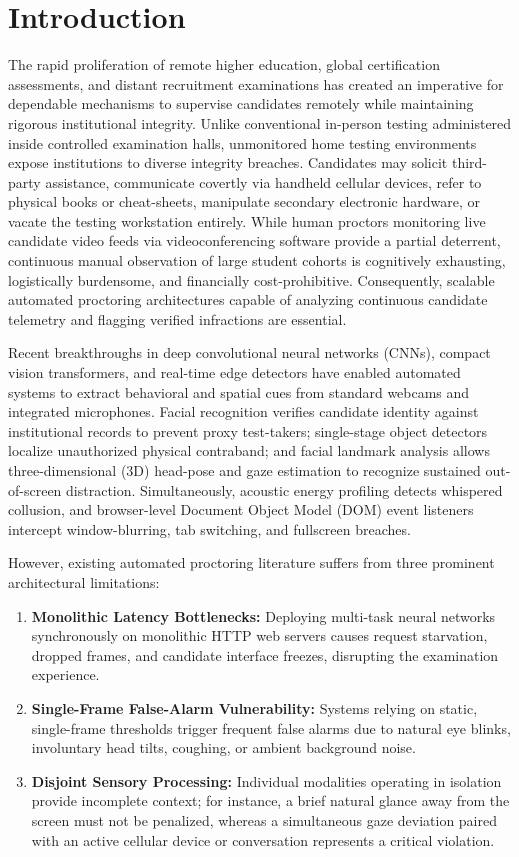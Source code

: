 \documentclass[conference]{IEEEtran}
\begin{document}
\section{Introduction}
The rapid proliferation of remote higher education, global certification assessments, and distant recruitment examinations has created an imperative for dependable mechanisms to supervise candidates remotely while maintaining rigorous institutional integrity. Unlike conventional in-person testing administered inside controlled examination halls, unmonitored home testing environments expose institutions to diverse integrity breaches. Candidates may solicit third-party assistance, communicate covertly via handheld cellular devices, refer to physical books or cheat-sheets, manipulate secondary electronic hardware, or vacate the testing workstation entirely. While human proctors monitoring live candidate video feeds via videoconferencing software provide a partial deterrent, continuous manual observation of large student cohorts is cognitively exhausting, logistically burdensome, and financially cost-prohibitive. Consequently, scalable automated proctoring architectures capable of analyzing continuous candidate telemetry and flagging verified infractions are essential.

Recent breakthroughs in deep convolutional neural networks (CNNs), compact vision transformers, and real-time edge detectors have enabled automated systems to extract behavioral and spatial cues from standard webcams and integrated microphones. Facial recognition verifies candidate identity against institutional records to prevent proxy test-takers; single-stage object detectors localize unauthorized physical contraband; and facial landmark analysis allows three-dimensional (3D) head-pose and gaze estimation to recognize sustained out-of-screen distraction. Simultaneously, acoustic energy profiling detects whispered collusion, and browser-level Document Object Model (DOM) event listeners intercept window-blurring, tab switching, and fullscreen breaches.

However, existing automated proctoring literature suffers from three prominent architectural limitations:
\begin{enumerate}
    \item \textbf{Monolithic Latency Bottlenecks:} Deploying multi-task neural networks synchronously on monolithic HTTP web servers causes request starvation, dropped frames, and candidate interface freezes, disrupting the examination experience.
    \item \textbf{Single-Frame False-Alarm Vulnerability:} Systems relying on static, single-frame thresholds trigger frequent false alarms due to natural eye blinks, involuntary head tilts, coughing, or ambient background noise.
    \item \textbf{Disjoint Sensory Processing:} Individual modalities operating in isolation provide incomplete context; for instance, a brief natural glance away from the screen must not be penalized, whereas a simultaneous gaze deviation paired with an active cellular device or conversation represents a critical violation.
\end{enumerate}
\end{document}
